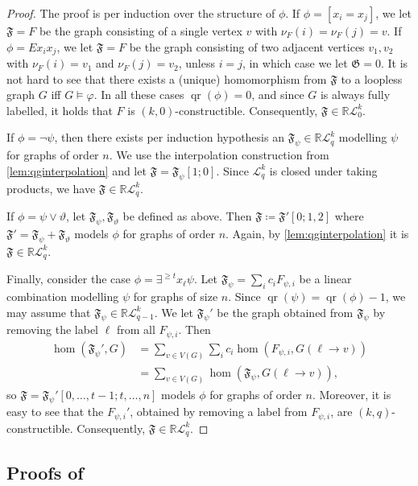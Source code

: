 \documentclass[10pt,a4paper]{article}
\renewcommand{\theta}{\vartheta}
\newcommand{\R}{\ensuremath{\mathbb{R}}}
\newcommand{\Lkq}{\ensuremath{\mathcal{L}_{q}^{k}}}
\newcommand{\LParam}[2]{\ensuremath{\mathcal{L}_{#2}^{#1}}}
\newcommand{\qg}[1]{\ensuremath{\mathfrak{#1}}} \newcommand{\qgp}[3]{\ensuremath{\mathfrak{#1}[#3; #2]}}
\DeclareMathOperator{\qr}{qr}
\newcommand{\elimOrd}[2]{$(#1,#2)$-constructible}
\begin{document}
  \qgFromCkq*

  \begin{proof}
    The proof is per induction over the structure of $\phi$. If $\phi = [x_i = x_j]$, we let $\qg{F} = F$ be the graph consisting of a single vertex $v$ with $\nu_F(i) = \nu_F(j) = v$. If $\phi = Ex_ix_j$, we let $\qg{F} = F$ be the graph consisting of two adjacent vertices $v_1, v_2$ with $\nu_F(i) = v_1$ and $\nu_F(j) = v_2$, unless $i = j$, in which case we let $\qg{G} = 0$. It is not hard to see that there exists a (unique) homomorphism from $\qg{F}$ to a loopless graph $G$ iff $G \models \varphi$. In all these cases $\qr(\phi) = 0$, and since $G$ is always fully labelled, it holds that $F$ is \elimOrd{k}{0}. Consequently, $\qg{F} \in \R\LParam{k}{0}$.

    If $\phi = \neg \psi$, then there exists per induction hypothesis an $\qg{F}_\psi \in \R\Lkq$ modelling $\psi$ for graphs of order $n$. We use the interpolation construction from \cref{lem:qginterpolation} and let $\qg{F} = \qgp{F_\psi}{0}{1}$. Since $\Lkq$ is closed under taking products, we have $\qg{F} \in \R\Lkq$.

    If $\phi = \psi \lor \theta$, let $\qg{F_\psi}, \qg{F_\theta}$ be defined as above. Then $\qg{F} \coloneqq \qgp{F'}{1, 2}{0}$ where $\qg{F'} = \qg{F_\psi} + \qg{F_\theta}$ models $\phi$ for graphs of order $n$. Again, by \cref{lem:qginterpolation} it is $\qg{F} \in \R\Lkq$.

    Finally, consider the case $\phi = \exists^{\geq t} x_\ell \psi$. Let $\qg{F_\psi} = \sum_{i}c_iF_{\psi, i}$ be a linear combination modelling $\psi$ for graphs of size $n$. Since $\qr(\psi) = \qr(\phi) - 1$, we may assume that $\qg{F_\psi} \in \R\LParam{k}{q-1}$.
    We let $\qg{F_\psi'}$ be the graph obtained from $\qg{F_\psi}$ by removing the label $\ell$ from all $F_{\psi, i}$. Then
        \begin{align*}
          \hom(\qg{F_\psi'}, G) &= \sum_{v \in V(G)}\sum_i c_i\hom(F_{\psi, i}, G(\ell \to v))\\
          &= \sum_{v \in V(G)}\hom(\qg{F_\psi}, G(\ell \to v)),
        \end{align*}
    so $\qg{F} = \qgp{F_\psi'}{t, \dots, n}{0, \dots, t-1}$ models $\phi$ for graphs of order $n$. Moreover, it is easy to see that the $F_{\psi, i}'$, obtained by removing a label from $F_{\psi, i}$, are \elimOrd{k}{q}. Consequently, $\qg{F} \in \R\Lkq$.
  \end{proof}

  \subsection{Proofs of }
  \label{app:gc-homind}
\end{document}
